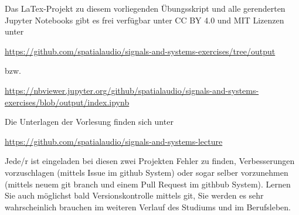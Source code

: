 \newpage
Das LaTex-Projekt zu diesem vorliegenden Übungsskript und alle gerenderten Jupyter
Notebooks gibt es frei verfügbar unter CC BY 4.0 und MIT Lizenzen unter
\begin{mdframed}[backgroundcolor=C2!10]
\url{https://github.com/spatialaudio/signals-and-systems-exercises/tree/output}
\end{mdframed}
bzw.
\begin{mdframed}[backgroundcolor=C2!10]
\url{https://nbviewer.jupyter.org/github/spatialaudio/signals-and-systems-exercises/blob/output/index.ipynb}
\end{mdframed}
%

%
Die Unterlagen der Vorlesung finden sich unter
\begin{mdframed}[backgroundcolor=C2!10]
\url{https://github.com/spatialaudio/signals-and-systems-lecture}
\end{mdframed}
%
Jede/r ist eingeladen bei diesen zwei Projekten Fehler zu finden, Verbesserungen
vorzuschlagen (mittels Issue im github System) oder sogar selber vorzunehmen
(mittels neuem git branch und einem Pull Request im githbub System).
%
Lernen Sie auch möglichst bald Versionskontrolle mittels git, Sie werden es sehr
wahrscheinlich brauchen im weiteren Verlauf des Studiums und im Berufsleben.

\newpage
